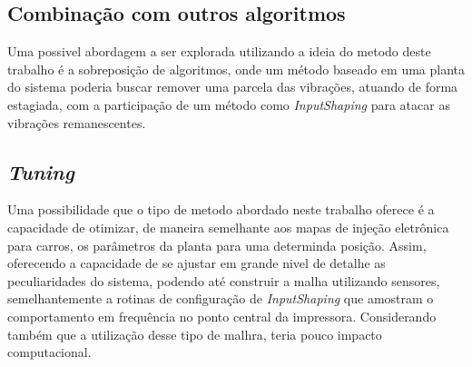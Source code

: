 \subsection{Combinação com outros algoritmos}
Uma possivel abordagem a ser explorada utilizando a ideia do metodo deste trabalho é a sobreposição de algoritmos, onde
um método baseado em uma planta do sistema poderia buscar remover uma parcela das vibrações, atuando de forma estagiada,
com a participação de um método como \textit{InputShaping} para atacar as vibrações remanescentes.

\subsection{\textit{Tuning}}
Uma possibilidade que o tipo de metodo abordado neste trabalho oferece é a capacidade de otimizar, de maneira
semelhante aos mapas de injeção eletrônica para carros, os parâmetros da planta para uma determinda posição.
Assim, oferecendo a capacidade de se ajustar em grande nivel de detalhe as peculiaridades do sistema, podendo até
construir a malha utilizando sensores, semelhantemente a rotinas de configuração de \textit{InputShaping} que amostram
o comportamento em frequência no ponto central da impressora. Considerando também que a utilização desse tipo de malhra,
teria pouco impacto computacional.



